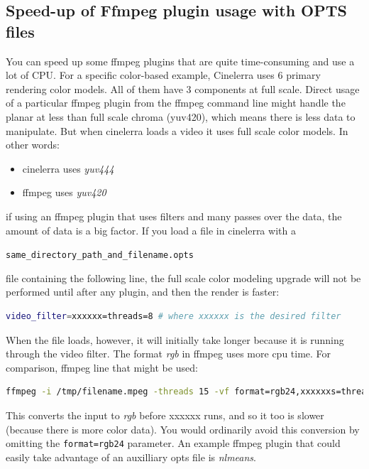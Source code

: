 \subsection{Speed-up of Ffmpeg plugin usage with OPTS files}%
\label{sub:speedup_ffmpeg_plugin_opts}

You can speed up some ffmpeg plugins that are quite time-consuming and use a lot of CPU. For a specific color-based example, Cinelerra uses 6 primary rendering color models. All of them have 3 components at full scale. Direct usage of a particular ffmpeg plugin from the ffmpeg command line might handle the planar at less than full scale chroma (yuv420), which means there is less data to manipulate. But when cinelerra loads a video it uses full scale color models. In other words:

\begin{itemize}[noitemsep]
    \item cinelerra uses \textit{yuv444}
    \item ffmpeg uses \textit{yuv420}
\end{itemize}

if using an ffmpeg plugin that uses filters and many passes over the data, the amount of data is a big factor. If you load a file in cinelerra with a

\texttt{same\_directory\_path\_and\_filename.opts}

file containing the following line, the full scale color modeling upgrade will not be performed until after any plugin, and then the render is faster:

\begin{lstlisting}[language=Bash]
video_filter=xxxxxx=threads=8 # where xxxxxx is the desired filter
\end{lstlisting}

When the file loads, however, it will initially take longer because it is running through the video filter. The format \textit{rgb} in ffmpeg uses more cpu time. For comparison, ffmpeg line that might be used:

\begin{lstlisting}[language=Bash]
ffmpeg -i /tmp/filename.mpeg -threads 15 -vf format=rgb24,xxxxxxs=threads=8 -acodec ac3 -vcodec libx265 - y /tmp/x.mp4
\end{lstlisting}

This converts the input to \textit{rgb} before xxxxxx runs, and so it too is slower (because there is more color data). You would ordinarily avoid this conversion by omitting the \texttt{format=rgb24} parameter. An example ffmpeg plugin that could easily take advantage of an auxilliary opts file is \textit{nlmeans}.

